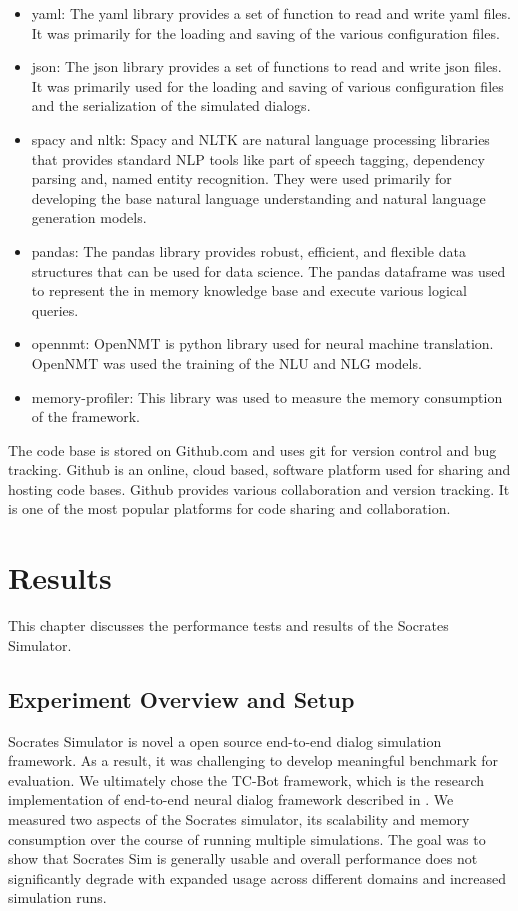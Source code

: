 \begin{itemize}
	\item yaml: The yaml library provides a set of function to read and write yaml files. It was primarily for the loading and saving of the various configuration files. 
	\item json: The json library provides a set of functions to read and write json files. It was primarily used for the loading and saving of various configuration files and the serialization of the simulated dialogs. 
	\item spacy and nltk: Spacy and NLTK are natural language processing libraries that provides standard NLP tools like part of speech tagging, dependency parsing and, named entity recognition. They were used primarily for developing the base natural language understanding and natural language generation models. 
	\item pandas: The pandas library provides robust, efficient, and flexible data structures that can be used for data science. The pandas dataframe was used to represent the in memory knowledge base and execute various logical queries.
	\item opennmt: OpenNMT is python library used for neural machine translation. OpenNMT was used the training of the NLU and NLG models.
	\item memory-profiler: This library was used to measure the memory consumption of the framework.  
\end{itemize}

The code base is stored on Github.com and uses git for version control and bug tracking. Github is an online, cloud based, software platform used for sharing and hosting code bases. Github provides various collaboration and version tracking. It is one of the most popular platforms for code sharing and collaboration. 

\chapter{Results}

This chapter discusses the performance tests and results of the Socrates Simulator.

\section{Experiment Overview and Setup}

 Socrates Simulator is novel a open source end-to-end dialog simulation framework. As a result, it was challenging to develop meaningful benchmark for evaluation. We ultimately chose the TC-Bot framework, which is the research implementation of end-to-end neural dialog framework described in \cite{li_end_to_end}. We measured two aspects of the Socrates simulator, its scalability and memory consumption over the course of running multiple simulations. The goal was to show that Socrates Sim is generally usable and overall performance does not significantly degrade with expanded usage across different domains and increased simulation runs. 
 
